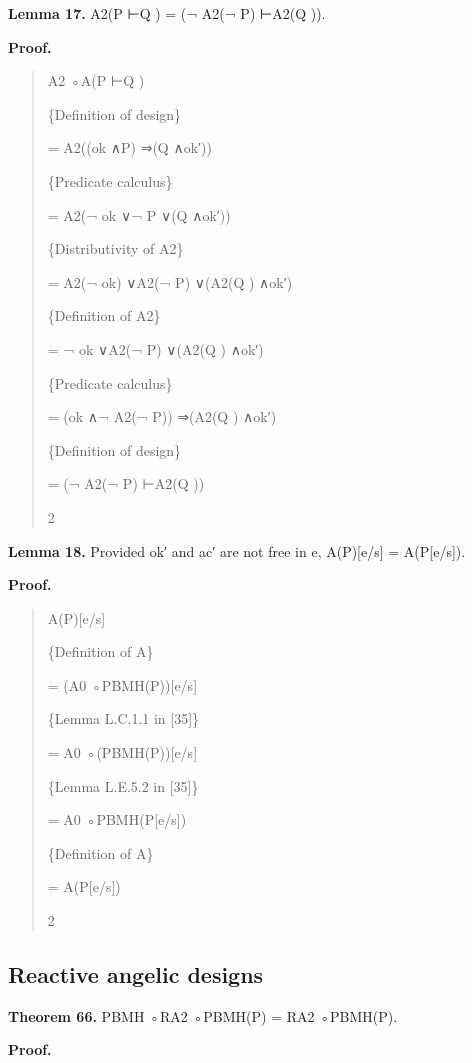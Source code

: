 \documentclass[11pt]{article}
\begin{document}
\noindent\textbf{Lemma 17.} A2(P ⊢Q ) = (¬ A2(¬ P) ⊢A2(Q )).


\noindent\textbf{Proof.}


\begin{quote}\small\raggedright
A2 ◦A(P ⊢Q )
\par
\{Definition of design\}
\par
= A2((ok ∧P) ⇒(Q ∧ok′))
\par
\{Predicate calculus\}
\par
= A2(¬ ok ∨¬ P ∨(Q ∧ok′))
\par
\{Distributivity of A2\}
\par
= A2(¬ ok) ∨A2(¬ P) ∨(A2(Q ) ∧ok′)
\par
\{Definition of A2\}
\par
= ¬ ok ∨A2(¬ P) ∨(A2(Q ) ∧ok′)
\par
\{Predicate calculus\}
\par
= (ok ∧¬ A2(¬ P)) ⇒(A2(Q ) ∧ok′)
\par
\{Definition of design\}
\par
= (¬ A2(¬ P) ⊢A2(Q ))
\par
2
\end{quote}

\noindent\textbf{Lemma 18.} Provided ok′ and ac′ are not free in e, A(P)[e/s] = A(P[e/s]).


\noindent\textbf{Proof.}


\begin{quote}\small\raggedright
A(P)[e/s]
\par
\{Definition of A\}
\par
= (A0 ◦PBMH(P))[e/s]
\par
\{Lemma L.C.1.1 in [35]\}
\par
= A0 ◦(PBMH(P))[e/s]
\par
\{Lemma L.E.5.2 in [35]\}
\par
= A0 ◦PBMH(P[e/s])
\par
\{Definition of A\}
\par
= A(P[e/s])
\par
2
\end{quote}

\subsection{Reactive angelic designs}
\noindent\textbf{Theorem 66.} PBMH ◦RA2 ◦PBMH(P) = RA2 ◦PBMH(P).


\noindent\textbf{Proof.}
\end{document}
